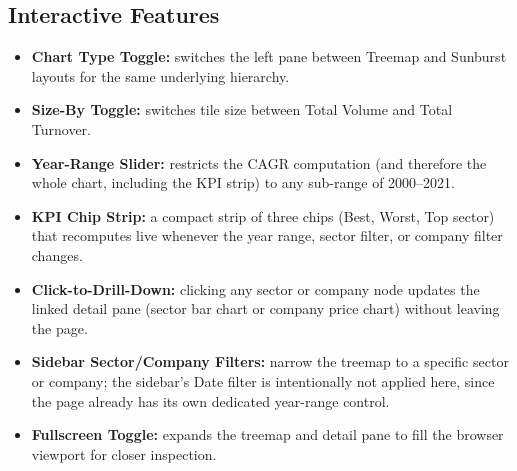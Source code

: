 \documentclass[14pt,a4paper]{extreport}
\begin{document}
\subsection{Interactive Features}
\begin{itemize}
    \item \textbf{Chart Type Toggle:} switches the left pane between
        Treemap and Sunburst layouts for the same underlying hierarchy.
    \item \textbf{Size-By Toggle:} switches tile size between Total
        Volume and Total Turnover.
    \item \textbf{Year-Range Slider:} restricts the CAGR computation (and
        therefore the whole chart, including the KPI strip) to any
        sub-range of 2000--2021.
    \item \textbf{KPI Chip Strip:} a compact strip of three chips (Best,
        Worst, Top sector) that recomputes live whenever the year range,
        sector filter, or company filter changes.
    \item \textbf{Click-to-Drill-Down:} clicking any sector or company
        node updates the linked detail pane (sector bar chart or company
        price chart) without leaving the page.
    \item \textbf{Sidebar Sector/Company Filters:} narrow the treemap to a
        specific sector or company; the sidebar's Date filter is
        intentionally not applied here, since the page already has its
        own dedicated year-range control.
    \item \textbf{Fullscreen Toggle:} expands the treemap and detail pane
        to fill the browser viewport for closer inspection.
\end{itemize}
\end{document}
